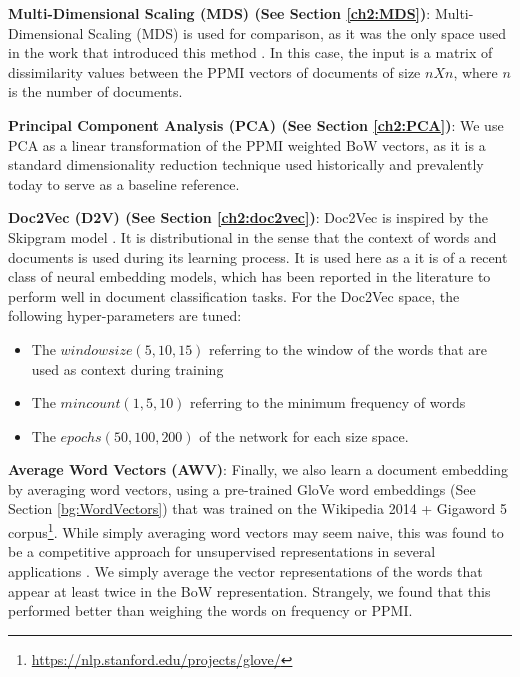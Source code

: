 \textbf{Multi-Dimensional Scaling (MDS) (See Section \ref{ch2:MDS})}:  Multi-Dimensional Scaling (MDS) is used for comparison, as it was the only space used in the work that introduced this method \cite{derracAIJ}. In this case, the input is a matrix of dissimilarity values between the PPMI vectors of documents of size  $n X n$, where $n$ is the number of documents.  %

\textbf{Principal Component Analysis (PCA) (See Section \ref{ch2:PCA})}: We use PCA as a linear transformation of the PPMI weighted BoW vectors, as it is a standard dimensionality reduction technique used historically and prevalently today to serve as a baseline reference.

\textbf{Doc2Vec (D2V) (See Section \ref{ch2:doc2vec})}: Doc2Vec is inspired by the Skipgram model \cite{DBLP:conf/icml/LeM14}.  It is distributional in the sense that the context of words and documents is used during its learning process. It is used here as a it is of a recent class of neural embedding models, which has been reported in the literature to perform well in document classification tasks. For the Doc2Vec space, the following hyper-parameters are tuned: 

\begin{itemize}
	\item The ${window size} (5, 10, 15)$ referring to the  window of the words that are used as context during training 
	\item The ${min count} (1, 5, 10)$ referring to the minimum frequency of words  
	\item The ${epochs} (50, 100, 200)$ of the network for each size space. 
\end{itemize}



\textbf{Average Word Vectors (AWV)}: Finally, we also learn a document embedding by averaging word vectors, using a pre-trained GloVe word embeddings (See Section \ref{bg:WordVectors}) that was trained on the Wikipedia 2014 + Gigaword 5 corpus\footnote{\url{https://nlp.stanford.edu/projects/glove/}}. While simply averaging word vectors may seem naive, this was found to be a competitive approach for unsupervised representations in several applications \cite{DBLP:conf/naacl/HillCK16}. We simply average the vector representations of the words that appear at least twice in the BoW representation. Strangely, we found that this performed better than weighing the words on frequency or PPMI.

